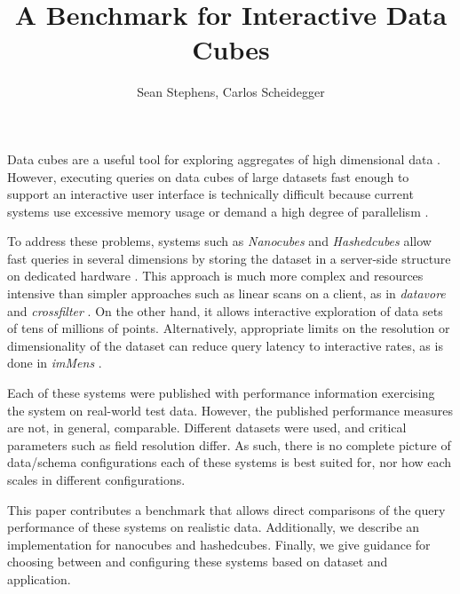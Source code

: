 \documentclass[journal]{vgtc}                %
\title{A Benchmark for Interactive Data Cubes}
\author{Sean Stephens, Carlos Scheidegger}
\begin{document}


\maketitle

Data cubes are a useful tool for exploring aggregates of high dimensional data
\cite{data_cubes}. However, executing queries on data cubes of large datasets
fast enough to support an interactive user interface is technically difficult
because current systems use excessive memory usage or demand a high degree of
parallelism \cite{nanocubes, parallel_paper}.

To address these problems, systems such as \textit{Nanocubes} and
\textit{Hashedcubes} allow fast queries in several dimensions by storing the
dataset in a server-side structure on dedicated hardware
\cite{nanocube}\cite{hashedcube}. This approach is much more complex and
resources intensive than simpler approaches such as linear scans on a client,
as in \textit{datavore} and \textit{crossfilter} \cite{datavore,crossfilter}.
On the other hand, it allows interactive exploration of data sets of tens of
millions of points. Alternatively, appropriate limits on the resolution or dimensionality of the dataset can reduce query latency to interactive rates, as is done in \textit{imMens} \cite{imMens}. 

Each of these systems were published with performance information exercising
the system on real-world test data. However, the published performance measures
are not, in general, comparable. Different datasets were used, and critical
parameters such as field resolution differ. As such, there is no complete
picture of data/schema configurations each of these systems is best suited for,
nor how each scales in different configurations.

This paper contributes a benchmark that allows direct comparisons of the query
performance of these systems on realistic data. Additionally, we describe an
implementation for nanocubes and hashedcubes. Finally, we
give guidance for choosing between and configuring these systems based on
dataset and application.
\end{document}
